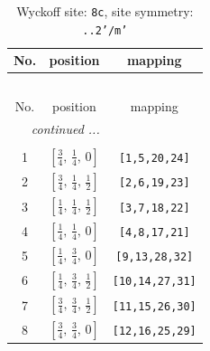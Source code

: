 \documentclass[fleqn,8pt]{jsarticle}
\begin{document}
\begin{longtable}{ccc}
\caption{Wyckoff site: {\tt 8c}, site symmetry: {\tt ..2'/m'}}
 \\
 \hline \hline
No. & position & mapping \\ \hline \endfirsthead

\multicolumn{2}{l}{\tablename\ \thetable{}} \\
 \hline \hline
No. & position & mapping \\ \hline \endhead

 \hline \hline
\multicolumn{2}{r}{\footnotesize\it continued ...} \\ \endfoot

 \hline \hline
\multicolumn{2}{r}{} \\ \endlastfoot

1 & $\left[ \frac{3}{4},\, \frac{1}{4},\, 0 \right]$ & {\tt [1,5,20,24]} \\ \hline
2 & $\left[ \frac{3}{4},\, \frac{1}{4},\, \frac{1}{2} \right]$ & {\tt [2,6,19,23]} \\ \hline
3 & $\left[ \frac{1}{4},\, \frac{1}{4},\, \frac{1}{2} \right]$ & {\tt [3,7,18,22]} \\ \hline
4 & $\left[ \frac{1}{4},\, \frac{1}{4},\, 0 \right]$ & {\tt [4,8,17,21]} \\ \hline
5 & $\left[ \frac{1}{4},\, \frac{3}{4},\, 0 \right]$ & {\tt [9,13,28,32]} \\ \hline
6 & $\left[ \frac{1}{4},\, \frac{3}{4},\, \frac{1}{2} \right]$ & {\tt [10,14,27,31]} \\ \hline
7 & $\left[ \frac{3}{4},\, \frac{3}{4},\, \frac{1}{2} \right]$ & {\tt [11,15,26,30]} \\ \hline
8 & $\left[ \frac{3}{4},\, \frac{3}{4},\, 0 \right]$ & {\tt [12,16,25,29]} \\
\end{longtable}
\renewcommand{\arraystretch}{1.2}
\end{document}
